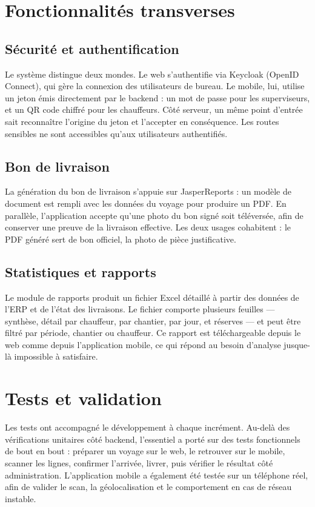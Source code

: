 \documentclass[12pt,a4paper]{report}
\begin{document}
\section{Fonctionnalités transverses}

\subsection{Sécurité et authentification}

Le système distingue deux mondes. Le web s'authentifie via Keycloak (OpenID Connect), qui gère la connexion des utilisateurs de bureau. Le mobile, lui, utilise un jeton émis directement par le backend : un mot de passe pour les superviseurs, et un QR code chiffré pour les chauffeurs. Côté serveur, un même point d'entrée sait reconnaître l'origine du jeton et l'accepter en conséquence. Les routes sensibles ne sont accessibles qu'aux utilisateurs authentifiés.

\subsection{Bon de livraison}

La génération du bon de livraison s'appuie sur JasperReports : un modèle de document est rempli avec les données du voyage pour produire un PDF. En parallèle, l'application accepte qu'une photo du bon signé soit téléversée, afin de conserver une preuve de la livraison effective. Les deux usages cohabitent : le PDF généré sert de bon officiel, la photo de pièce justificative.

\subsection{Statistiques et rapports}

Le module de rapports produit un fichier Excel détaillé à partir des données de l'ERP et de l'état des livraisons. Le fichier comporte plusieurs feuilles — synthèse, détail par chauffeur, par chantier, par jour, et réserves — et peut être filtré par période, chantier ou chauffeur. Ce rapport est téléchargeable depuis le web comme depuis l'application mobile, ce qui répond au besoin d'analyse jusque-là impossible à satisfaire.

\section{Tests et validation}

Les tests ont accompagné le développement à chaque incrément. Au-delà des vérifications unitaires côté backend, l'essentiel a porté sur des tests fonctionnels de bout en bout : préparer un voyage sur le web, le retrouver sur le mobile, scanner les lignes, confirmer l'arrivée, livrer, puis vérifier le résultat côté administration. L'application mobile a également été testée sur un téléphone réel, afin de valider le scan, la géolocalisation et le comportement en cas de réseau instable.
\end{document}
